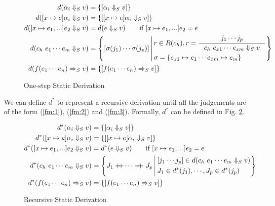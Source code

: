 \begin{figure}
    \begin{align}
        d(\alpha_i \Da_S v) & = \{ [ \alpha_i \Da_S v ] \} \label{fm:1} \\
        d([x\mapsto e]\alpha_i \Da_S v) & = \{ [ [x\mapsto e]\alpha_i \Da_S v ] \} \label{fm:2} \\
        d([x\mapsto e_1, ...]e_2 \Da_S v) & = d(e \Da_S v) \qquad \text{if $[x\mapsto e_1, ...]e_2=e$} \\
        d(c_h~e_1\cdots e_m \Da_S v) & = \left\{ [\sigma(j_1)\cdots \sigma(j_p)] \given \begin{aligned}
            & r \in R(c_h), r = \inference{j_1\cdots j_p}{c_h~e_{x1}\cdots e_{xm} \Da_S v} \\
            & \sigma=\{e_{x1}\mapsto e_1 \cdots e_{xm}\mapsto e_m \}
        \end{aligned} \right\} \\
        d(f(e_1\cdots e_n) =>_S v) & = \{ [ f(e_1\cdots e_n) =>_S v ] \} \label{fm:3}
    \end{align}
    \caption{One-step Static Derivation}
    \label{fig:one-step}
\end{figure}
 

We can define $d^{*}$ to represent a recursive derivation until all the judgements are of the form (\ref{fm:1}), (\ref{fm:2}) and (\ref{fm:3}). 
Formally, $d^{*}$ can be defined in Fig. \ref{fig:derivation}. 

\begin{figure}
    \begin{align}
        d^{*}(\alpha_i \Downarrow_S v) & = \{ [ \alpha_i \Downarrow_S v ] \} \label{fm:ds1} \\
        d^{*}([x\mapsto e]\alpha_i \Downarrow_S v) & = \{ [ [x\mapsto e]\alpha_i \Downarrow_S v ] \} \label{fm:ds2} \\
        d^{*}([x\mapsto e_1, ...]e_2 \Downarrow_S v) & = d^{*}(e \Downarrow_S v) \qquad \text{if $[x\mapsto e_1, ...]e_2=e$} \\
        d^{*}(c_h~e_1\cdots e_m \Downarrow_S v) & = \left\{ J_1 +\!\!\!+ \cdots +\!\!\!+\ J_p \,\middle\vert\, \begin{aligned}
            & [j_1\cdots j_p] \in d(c_h~e_1\cdots e_m \Downarrow_S v) \\
            & J_1 \in d^{*}(j_1) , \cdots , J_p \in d^{*}(j_p)
        \end{aligned} \right\} \\
        d^{*}( f(e_1\cdots e_n) =>_S v ) & = \{ [ f(e_1\cdots e_n) =>_S v ] \} \label{fm:ds3}
    \end{align}
    \caption{Recursive Static Derivation}
    \label{fig:derivation}
\end{figure}

